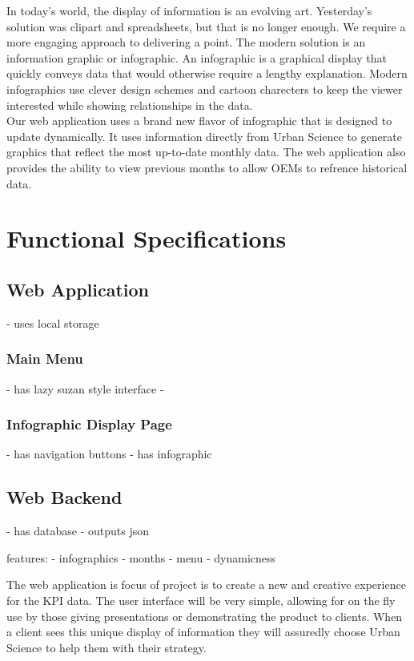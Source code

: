 \documentclass[11pt,a4paper,oneside]{article}
\begin{document}
In today's world, the display of information is an evolving art.  Yesterday's solution was clipart and spreadsheets, but that is no longer enough.  We require a more engaging approach to delivering a point.  The modern solution is an information graphic or infographic.  An infographic is a graphical display that quickly conveys data that would otherwise require a lengthy explanation.  Modern infographics use clever design schemes and cartoon charecters to keep the viewer interested while showing relationships in the data.\\


Our web application uses a brand new flavor of infographic that is designed to update dynamically.  It uses information directly from Urban Science to generate graphics that reflect the most up-to-date monthly data.  The web application also provides the ability to view previous months to allow OEMs to refrence historical data.\\


\section{Functional Specifications}

\subsection {Web Application}
 - uses local storage


\subsubsection {Main Menu}
 - has lazy suzan style interface
 - 

\subsubsection {Infographic Display Page}
 - has navigation buttons
 - has infographic


\subsection {Web Backend}
 - has database
 - outputs json



features: 
   - infographics
   - months
   - menu
   - dynamicness


The web application is focus of project is to create a new and creative experience for the KPI data. The user interface will be very simple, allowing for on the fly use by those giving presentations or demonstrating the product to clients. When a client sees this unique display of information they will assuredly choose Urban Science to help them with their strategy.\\
\end{document}
